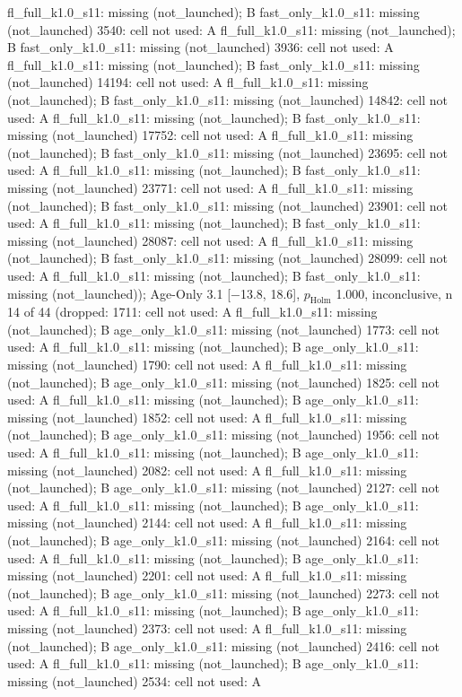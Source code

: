 \begin{table}[t]
{fl\_full\_k1.0\_s11: missing (not\_launched); B fast\_only\_k1.0\_s11: missing (not\_launched) \textbar{} 3540: cell not used: A fl\_full\_k1.0\_s11: missing (not\_launched); B fast\_only\_k1.0\_s11: missing (not\_launched) \textbar{} 3936: cell not used: A fl\_full\_k1.0\_s11: missing (not\_launched); B fast\_only\_k1.0\_s11: missing (not\_launched) \textbar{} 14194: cell not used: A fl\_full\_k1.0\_s11: missing (not\_launched); B fast\_only\_k1.0\_s11: missing (not\_launched) \textbar{} 14842: cell not used: A fl\_full\_k1.0\_s11: missing (not\_launched); B fast\_only\_k1.0\_s11: missing (not\_launched) \textbar{} 17752: cell not used: A fl\_full\_k1.0\_s11: missing (not\_launched); B fast\_only\_k1.0\_s11: missing (not\_launched) \textbar{} 23695: cell not used: A fl\_full\_k1.0\_s11: missing (not\_launched); B fast\_only\_k1.0\_s11: missing (not\_launched) \textbar{} 23771: cell not used: A fl\_full\_k1.0\_s11: missing (not\_launched); B fast\_only\_k1.0\_s11: missing (not\_launched) \textbar{} 23901: cell not used: A fl\_full\_k1.0\_s11: missing (not\_launched); B fast\_only\_k1.0\_s11: missing (not\_launched) \textbar{} 28087: cell not used: A fl\_full\_k1.0\_s11: missing (not\_launched); B fast\_only\_k1.0\_s11: missing (not\_launched) \textbar{} 28099: cell not used: A fl\_full\_k1.0\_s11: missing (not\_launched); B fast\_only\_k1.0\_s11: missing (not\_launched)); Age-Only 3.1 [$-$13.8, 18.6], $p_\mathrm{Holm}$ 1.000, inconclusive, n 14 of 44 (dropped: 1711: cell not used: A fl\_full\_k1.0\_s11: missing (not\_launched); B age\_only\_k1.0\_s11: missing (not\_launched) \textbar{} 1773: cell not used: A fl\_full\_k1.0\_s11: missing (not\_launched); B age\_only\_k1.0\_s11: missing (not\_launched) \textbar{} 1790: cell not used: A fl\_full\_k1.0\_s11: missing (not\_launched); B age\_only\_k1.0\_s11: missing (not\_launched) \textbar{} 1825: cell not used: A fl\_full\_k1.0\_s11: missing (not\_launched); B age\_only\_k1.0\_s11: missing (not\_launched) \textbar{} 1852: cell not used: A fl\_full\_k1.0\_s11: missing (not\_launched); B age\_only\_k1.0\_s11: missing (not\_launched) \textbar{} 1956: cell not used: A fl\_full\_k1.0\_s11: missing (not\_launched); B age\_only\_k1.0\_s11: missing (not\_launched) \textbar{} 2082: cell not used: A fl\_full\_k1.0\_s11: missing (not\_launched); B age\_only\_k1.0\_s11: missing (not\_launched) \textbar{} 2127: cell not used: A fl\_full\_k1.0\_s11: missing (not\_launched); B age\_only\_k1.0\_s11: missing (not\_launched) \textbar{} 2144: cell not used: A fl\_full\_k1.0\_s11: missing (not\_launched); B age\_only\_k1.0\_s11: missing (not\_launched) \textbar{} 2164: cell not used: A fl\_full\_k1.0\_s11: missing (not\_launched); B age\_only\_k1.0\_s11: missing (not\_launched) \textbar{} 2201: cell not used: A fl\_full\_k1.0\_s11: missing (not\_launched); B age\_only\_k1.0\_s11: missing (not\_launched) \textbar{} 2273: cell not used: A fl\_full\_k1.0\_s11: missing (not\_launched); B age\_only\_k1.0\_s11: missing (not\_launched) \textbar{} 2373: cell not used: A fl\_full\_k1.0\_s11: missing (not\_launched); B age\_only\_k1.0\_s11: missing (not\_launched) \textbar{} 2416: cell not used: A fl\_full\_k1.0\_s11: missing (not\_launched); B age\_only\_k1.0\_s11: missing (not\_launched) \textbar{} 2534: cell not used: A }
\end{table}

